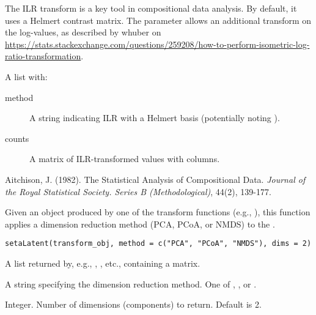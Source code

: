 \documentclass[a4paper]{book}
\begin{document}
%
\begin{Details}
The ILR transform is a key tool in compositional data analysis. By default, it
uses a Helmert contrast matrix. The parameter  allows an
additional transform on the log-values, as described by whuber on
\url{https://stats.stackexchange.com/questions/259208/how-to-perform-isometric-log-ratio-transformation}.
\end{Details}
%
\begin{Value}
A list with:
\begin{description}

\item[method] A string indicating ILR with a Helmert basis (potentially noting ).
\item[counts] A matrix of ILR-transformed values with  columns.

\end{description}

\end{Value}
%
\begin{References}
Aitchison, J. (1982). The Statistical Analysis of Compositional Data.
\emph{Journal of the Royal Statistical Society. Series B (Methodological)}, 44(2), 139-177.
\end{References}
%
\begin{Examples}
\end{Examples}
%
\begin{Description}
Given an object produced by one of the  transform functions (e.g., ),
this function applies a dimension reduction method (PCA, PCoA, or NMDS) to the
.
\end{Description}
%
\begin{Usage}
\begin{verbatim}
setaLatent(transform_obj, method = c("PCA", "PCoA", "NMDS"), dims = 2)
\end{verbatim}
\end{Usage}
%
\begin{Arguments}
\begin{ldescription}
\item[\code{transform\_obj}] A list returned by, e.g., , , etc.,
containing a  matrix.

\item[\code{method}] A string specifying the dimension reduction method. One of ,
, or .

\item[\code{dims}] Integer. Number of dimensions (components) to return. Default is 2.
\end{ldescription}
\end{Arguments}
\end{document}
